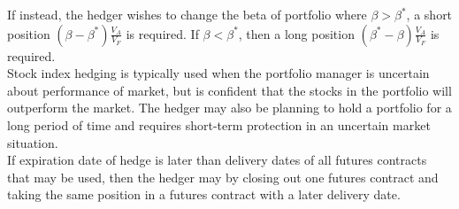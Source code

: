 If instead, the hedger wishes to change the beta of portfolio where $\beta > \beta^*$, a short position $(\beta - \beta^*)\frac{V_A}{V_F}$ is required. If $\beta < \beta^*$, then a long position $(\beta^* - \beta)\frac{V_A}{V_F}$ is required.\\

Stock index hedging is typically used when the portfolio manager is uncertain about performance of market, but is confident that the stocks in the portfolio will outperform the market. The hedger may also be planning to hold a portfolio for a long period of time and requires short-term protection in an uncertain market situation.\\

If expiration date of hedge is later than delivery dates of all futures contracts that may be used, then the hedger may  by closing out one futures contract and taking the same position in a futures contract with a later delivery date.




